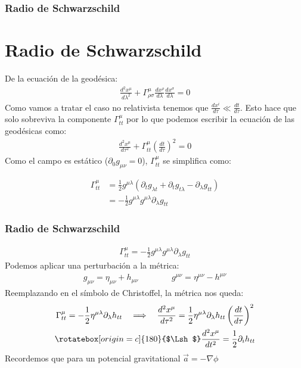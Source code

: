 \documentclass{beamer}
\begin{document}


\begin{frame}
\frametitle{Radio de Schwarzschild}
\section{Radio de Schwarzschild}

De la ecuación de la geodésica: 
\begin{gather*}
  \frac{d ^2 x ^ {\mu } }{d \lambda^2 } + \Gamma _{\rho \sigma } ^ {\mu} \frac{d x^\rho  }{d \lambda} \frac{d x ^ {\sigma} }{d \lambda} = 0 
\end{gather*}
Como vamos a tratar el caso no relativista tenemos que $ \frac{d x ^ {i } }{d \tau } \ll \frac{d t  }{d \tau } $. Esto hace que solo sobreviva la componente $ \Gamma _{tt } ^ {\mu } $ por lo que podemos escribir la ecuación de las geodésicas como: 
\begin{gather*}
  \frac{d ^2 x ^ {\mu } }{d \tau^2 } + \Gamma _{tt } ^ {\mu } \left(\frac{d t  }{d \tau }\right)^2 = 0  
\end{gather*}
Como el campo es estático ($ \partial _0 g _{\mu \nu } = 0 $), $ \Gamma _{tt } ^ {\mu } $ se simplifica como: 

\begin{align*}
  \Gamma _{tt } ^ {\mu } &= \frac{1}{2} g ^ {\mu \lambda} (\partial_t g _{\lambda t } + \partial_t g _{t \lambda} - \partial_\lambda g _{tt }  ) \\
    &= - \frac{1}{2} g ^ {\mu\lambda} g ^{\mu\lambda} \partial_\lambda g _{tt} 
\end{align*}
\end{frame}




\begin{frame}
\frametitle{Radio de Schwarzschild}
\begin{align*}
  \Gamma _{tt } ^ {\mu } = - \frac{1}{2} g ^ {\mu\lambda} g ^{\mu\lambda} \partial_\lambda g _{tt} 
\end{align*}
Podemos aplicar una perturbación a la métrica: 
\begin{gather*}
  g _{\mu \nu} = \eta _{\mu\nu}  + h _{\mu\nu} \qquad \qquad g ^ {\mu\nu} = \eta ^ {\mu\nu} - h ^ {\mu\nu}
\end{gather*}
Reemplazando en el símbolo de Christoffel, la métrica nos queda: 
\begin{gather*}
  \Gamma _{tt } ^ {\mu} = - \frac{1}{2} \eta ^ {\mu\lambda} \partial _{\lambda} h _{tt } \quad \Longrightarrow \quad \frac{d ^2 x ^ {\mu} }{d \tau^2 } = \frac{1}{2} \eta ^ {\mu\lambda} \partial_\lambda h _{tt } \left(\frac{d t  }{d \tau }\right)^2  \\
  \rotatebox[origin=c]{180}{$\Lsh$} \frac{d ^2 x ^ {\mu} }{d t^2 } = \frac{1}{2} \partial _{i }  h _{tt } 
\end{gather*}
Recordemos que para un potencial gravitational $ \vec a = -\nabla  \phi $
\end{frame}
\end{document}
